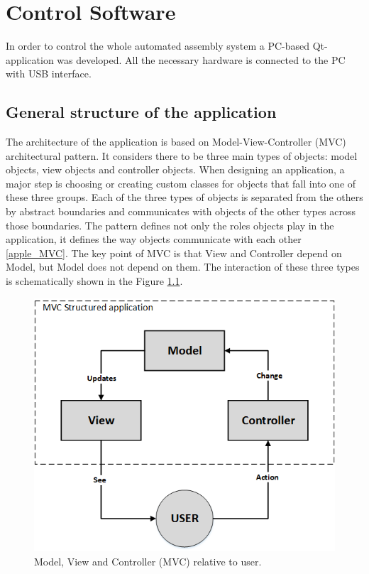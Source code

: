 \chapter{Control Software}

In order to control the whole automated assembly system a PC-based Qt-application was developed. All the necessary hardware is connected to the PC with USB interface.

\section{General structure of the application}

The architecture of the application is based on Model-View-Controller (MVC) architectural pattern. It considers there to be three main types of objects: model objects, view objects and controller objects. When designing an application, a major step is choosing or creating custom classes for objects that fall into one of these three groups. Each of the three types of objects is separated from the others by abstract boundaries and communicates with objects of the other types across those boundaries. The pattern defines not only the roles objects play in the application, it defines the way objects communicate with each other \ref{apple_MVC}. The key point of MVC is that View and Controller depend on Model, but Model does not depend on them. The  interaction of these three types is schematically shown in the Figure \ref{fig:mvc_general}.

\begin{figure}[ht]\centering
\includegraphics[width=0.7\linewidth]{Data/Control_Software/MVC_general.png}
\caption{Model, View and Controller (MVC) relative to user.}
\label{fig:mvc_general}
\end{figure}

